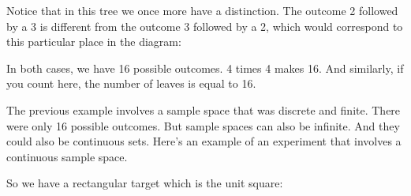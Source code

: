 \documentclass[pdftex, brazil, 12pt, twoside]{article}
\begin{document}
Notice that in this tree we once more have a distinction.
The outcome 2 followed by a 3 is different from the outcome
3 followed by a 2, which would correspond to this particular
place in the diagram:

\begin{figure}[H]
  \begin{center}
  \end{center}
\end{figure}

In both cases, we have 16 possible outcomes.
4 times 4 makes 16.
And similarly, if you count here, the number of leaves is
equal to 16.

The previous example involves a sample space that was
discrete and finite.
There were only 16 possible outcomes.
But sample spaces can also be infinite.
And they could also be continuous sets.
Here's an example of an experiment that involves a
continuous sample space.

So we have a rectangular target
which is the unit square:

\begin{figure}[H]
  \begin{center}
  \end{center}
\end{figure}
\end{document}

